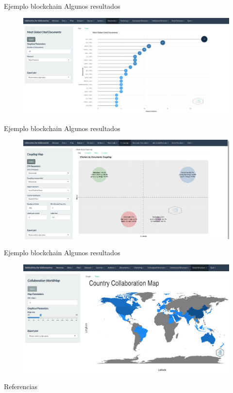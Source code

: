 \documentclass{beamer}
\begin{document}
\begin{frame}{Ejemplo blockchain}
Algunos resultados
\begin{figure}
\centering
\includegraphics[width=.95\textwidth]{Result3.png}
\end{figure}  
\end{frame}

\begin{frame}{Ejemplo blockchain}
Algunos resultados
\begin{figure}
\centering
\includegraphics[width=.95\textwidth]{Result4.png}
\end{figure}  
\end{frame}

\begin{frame}{Ejemplo blockchain}
Algunos resultados
\begin{figure}
\centering
\includegraphics[width=.95\textwidth]{Result5.png}
\end{figure}  
\end{frame}


\begin{frame}[allowframebreaks]{Referencias}
\tiny{ 


}
\end{frame}
\end{document}
